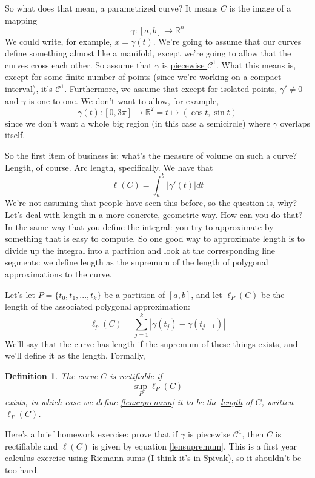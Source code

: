 \documentclass{article}
\newtheorem{definition}{Definition}
\newcommand{\reals}[0]{\mathbb{R}}
\newcommand{\mc}[1]{\mathcal{#1}}
\begin{document}
\begin{itemize}
  So what does that mean, a parametrized curve? It means \(C\) is the image of a mapping
  \begin{equation}
    \gamma : [a, b] \to \reals^n
  \end{equation}
  We could write, for example, \(x = \gamma(t)\). We're going to assume that our curves define something almost like a manifold, except we're going to allow that the curves cross each other. So assume that \(\gamma\) is \underline{piecewise \(\mc{C}^1\)}. What this means is, except for some finite number of points (since we're working on a compact interval), it's \(\mc{C}^1\). Furthermore, we assume that except for isolated points, \(\gamma' \neq 0\) and \(\gamma\) is one to one.
  We don't want to allow, for example,
  \begin{equation}
    \gamma(t): [0, 3\pi] \to \reals^2 = t \mapsto (\cos t, \sin t)
  \end{equation}
  since we don't want a whole big region (in this case a semicircle) where \(\gamma\) overlaps itself.

  So the first item of business is: what's the measure of volume on such a curve? Length, of course. Arc length, specifically. We have that
  \begin{equation}
    \ell(C) = \int_a^b|\gamma'(t)|dt
  \end{equation}
  We're not assuming that people have seen this before, so the question is, why? Let's deal with length in a more concrete, geometric way. How can you do that? In the same way that you define the integral: you try to approximate by something that is easy to compute. So one good way to approximate length is to divide up the integral into a partition and look at the corresponding line segments: we define length as the supremum of the length of polygonal approximations to the curve.

  Let's let \(P = \{t_0,t_1,...,t_k\}\) be a partition of \([a, b]\), and let \(\ell_P(C)\) be the length of the associated polygonal approximation:
  \begin{equation}
    \ell_p(C) = \sum_{j = 1}^k|\gamma(t_j) - \gamma(t_{j - 1})|
  \end{equation}
  We'll say that the curve has length if the supremum of these things exists, and we'll define it as the length. Formally,
  \begin{definition}
    The curve \(C\) is \underline{rectifiable} if
    \begin{equation}
      \sup_P\ell_P(C)
      \label{lensupremum}
    \end{equation}
    exists, in which case we define \ref{lensupremum} it to be the \underline{length} of \(C\), written \(\ell_P(C)\).
  \end{definition}
  Here's a brief homework exercise: prove that if \(\gamma\) is piecewise \(\mc{C}^1\), then \(C\) is rectifiable and \(\ell(C)\) is given by equation \ref{lensupremum}. This is a first year calculus exercise using Riemann sums (I think it's in Spivak), so it shouldn't be too hard.

\end{itemize}
\end{document}
